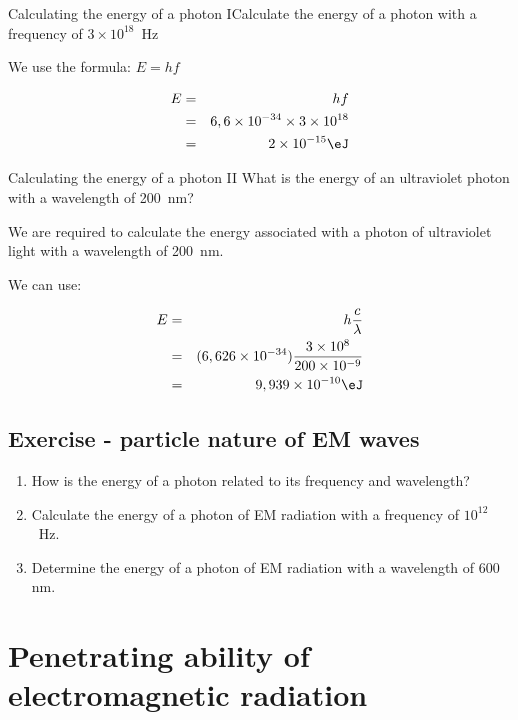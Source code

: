 \begin{wex}{Calculating the energy of a photon I}{Calculate the energy of a photon with a frequency of $3 \times 10^{18}$~Hz}
{
We use the formula: $E=hf$

\begin{eqnarray*}
E &=& hf\\
&=& 6,6 \times 10^{-34} \times 3 \times 10^{18}\\
&=& 2 \times 10^{-15} \eJ\\
\end{eqnarray*}}
\end{wex}

\begin{wex}{Calculating the energy of a photon II}
{What is the energy of an ultraviolet photon with a wavelength of 200~nm?}
{
We are required to calculate the energy associated with a photon of ultraviolet light with a wavelength of  200~nm.

We can use:

\begin{eqnarray*}
E & = & h\frac{c}{\lambda}\\
& = & (6,626 \times 10^{-34})\frac{3\times10^{8}}{200\times 10^{-9}}\\
& = & 9,939 \times 10^{-10}\eJ
\end{eqnarray*}}
\end{wex}


\subsection {Exercise - particle nature of EM waves}
\begin{enumerate}
\item How is the energy of a photon related to its frequency and wavelength?
\item Calculate the energy of a photon of EM radiation with a frequency of $10^{12}$~Hz.
\item Determine the energy of a photon of EM radiation with a wavelength of 600 nm.
\end{enumerate}

\section{Penetrating ability of electromagnetic radiation}
\label{p:em:emr12:pa}

